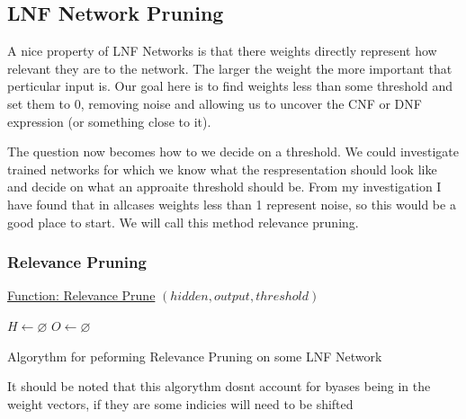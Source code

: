 \documentclass{article}
\theoremstyle{definition}
\begin{document}
\subsection{LNF Network Pruning}
A nice property of LNF Networks is that there weights directly represent how relevant they are to the network. The larger the weight the more important that perticular input is. Our goal here is to find weights less than some threshold and set them to 0, removing noise and allowing us to uncover the CNF or DNF expression (or something close to it).

The question now becomes how to we decide on a threshold. We could investigate trained networks for which we know what the respresentation should look like and decide on what an approaite threshold should be. From my investigation I have found that in allcases weights less than 1 represent noise, so this would be a good place to start. We will call this method relevance pruning.

\subsubsection{Relevance Pruning}
\begin{algorithm}[H]

\underline{Function: Relevance Prune} $(hidden,output,threshold)$\\

$H \gets \varnothing$
$O \gets \varnothing$

\caption{Algorythm for peforming Relevance Pruning on some LNF Network}
\end{algorithm}

It should be noted that this algorythm dosnt account for byases being in the weight vectors, if they are some indicies will need to be shifted

\medskip


\end{document}
